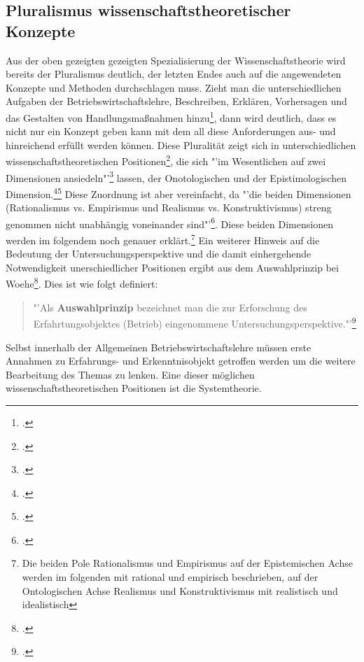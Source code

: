\documentclass[a4paper,12pt]{article}
\begin{document}
\subsection{Pluralismus wissenschaftstheoretischer Konzepte}\label{plural}
Aus der oben gezeigten gezeigten Spezialisierung der Wissenschaftstheorie wird bereits der Pluralismus deutlich, der letzten Endes auch auf die angewendeten Konzepte und Methoden durchschlagen muss. Zieht man die unterschiedlichen Aufgaben der Betriebswirtschaftslehre, Beschreiben, Erklären, Vorhersagen und das Gestalten von Handlungsmaßnahmen hinzu\footcite[S. 25]{Helfrich2024}, dann wird deutlich, dass es nicht nur ein Konzept geben kann mit dem all diese Anforderungen aus- und hinreichend erfüllt werden können. Diese Pluralität zeigt sich in unterschiedlichen wissenschaftstheoretischen Positionen\footcite[S. 93]{Helfrich2024}, die sich "'im Wesentlichen auf zwei Dimensionen ansiedeln"'\footcite[S. 94]{Helfrich2024} lassen, der Onotologischen und der Epistimologischen Dimension.\footcite[S. 94]{Helfrich2024}\footcite[S. 29]{Kornmeier2007} Diese Zuordnung ist aber vereinfacht, da "'die beiden Dimensionen (Rationalismus vs. Empirismus und Realismus vs. Konstruktivismus) streng genommen nicht unabhängig voneinander sind"'\footcite[S. 29]{Kornmeier2007}. Diese beiden Dimensionen werden im folgendem noch genauer erklärt.\footnote{Die beiden Pole Rationalismus und Empirismus auf der Epistemischen Achse werden im folgenden mit rational und empirisch beschrieben, auf der Ontologischen Achse Realismus und Konstruktivismus mit realistisch und idealistisch}
Ein weiterer Hinweis auf die Bedeutung der Untersuchungsperspektive und die damit einhergehende Notwendigkeit unerschiedlicher Positionen ergibt aus dem Auswahlprinzip bei Woehe\footcite[S. 38]{Woehe2008}. Dies ist wie folgt definiert:
\begin{quote}
"'Als \textbf{Auswahlprinzip} bezeichnet man die zur Erforschung des Erfahrtungsobjektes (Betrieb) eingenommene Untersuchungsperspektive."'\footcite[S. 38]{Woehe2008}    
\end{quote} 
Selbst innerhalb der Allgemeinen Betriebswirtschaftslehre müssen erste Annahmen zu Erfahrungs- und Erkenntnisobjekt getroffen werden um die weitere Bearbeitung des Themas zu lenken. Eine dieser möglichen wissenschaftstheoretischen Positionen ist die Systemtheorie.
\end{document}
